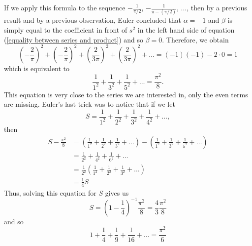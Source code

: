 If we apply this formula to the sequence $-\frac{1}{\pi/2}$, $-\frac{1}{\pi - (\pi/2)}$, ..., then by a previous result and by a previous observation, Euler concluded that $\alpha = -1$ and $\beta$ is simply equal to the coefficient in front of $s^2$ in the left hand side of equation (\ref{equality between series and product}) and so $\beta = 0$. Therefore, we obtain
$$\left(-\frac{2}{\pi}\right)^2 + \left(-\frac{2}{\pi}\right)^2 + \left(\frac{2}{3\pi}\right)^2 + \left(\frac{2}{3\pi}\right)^2 + \dots = (-1)(-1) - 2\cdot 0 = 1$$
which is equivalent to
\begin{equation} \label{zeta-2 but only odd numbers}
    \frac{1}{1^2} + \frac{1}{3^2} + \frac{1}{5^2} + \dots = \frac{\pi^2}{8}.
\end{equation}
This equation is very close to the series we are interested in, only the even terms are missing. Euler's last trick was to notice that if we let
$$S = \frac{1}{1^2} + \frac{1}{2^2} + \frac{1}{3^2} + \frac{1}{4^2} + \dots,$$
then 
\begin{align*}
    S - \frac{\pi^2}{8} &= \left(\frac{1}{1^2} + \frac{1}{2^2} + \frac{1}{3^2} + \dots\right) - \left(\frac{1}{1^2} + \frac{1}{3^2} + \frac{1}{5^2} + \dots\right) \\
    &= \frac{1}{2^2} + \frac{1}{4^2} + \frac{1}{6^2} + \dots \\
    &= \frac{1}{2^2}\left(\frac{1}{1^2} + \frac{1}{2^2} + \frac{1}{3^2} + \dots\right) \\
    &= \frac{1}{4}S
\end{align*} 
Thus, solving this equation for $S$ gives us 
$$S = \left(1 - \frac{1}{4}\right)^{-1}\frac{\pi^2}{8} = \frac{4}{3}\frac{\pi^2}{8}$$
and so 
\begin{equation} \label{pi^2/6}
    \boxed{1 + \frac{1}{4} + \frac{1}{9} + \frac{1}{16} + \dots = \frac{\pi^2}{6}}
\end{equation}

